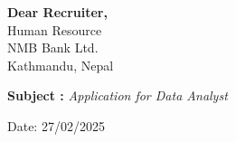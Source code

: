 \documentclass[11pt,A4]{article}
\begin{document}
\pagestyle{fancy}


\vspace{-20.55pt}


\hspace{-0.25\linewidth}\colorbox{bgcol}{}







\vspace{60pt}
{\textbf{Dear Recruiter,}}\\
{Human Resource}\\
{NMB Bank Ltd.}\\
{Kathmandu, Nepal}

\vspace{20pt}
\begin{center}
\textbf{Subject :} \textit{ Application for Data Analyst  }
\end{center}

\vspace{10pt}


\begin{flushright}
{Date: 27/02/2025}
\end{flushright}
\end{document}
